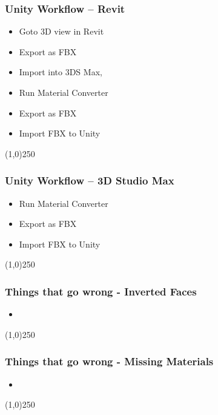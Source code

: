\begin{frame}
\frametitle{Unity Workflow -- Revit}
\begin{itemize}
	\item Goto 3D view in Revit
	\item Export as FBX
	\item Import into 3DS Max,
	\item Run Material Converter
	\item Export as FBX
	\item Import FBX to Unity
\end{itemize}
\end{frame}
\begin{center}\line(1,0){250}\end{center}


\begin{frame}
\frametitle{Unity Workflow -- 3D Studio Max}
\begin{itemize}
	\item Run Material Converter
	\item Export as FBX
	\item Import FBX to Unity
\end{itemize}
\end{frame}
\begin{center}\line(1,0){250}\end{center}





\begin{frame}
\frametitle{Things that go wrong - Inverted Faces }
\begin{figure}
	\centering
	\caption[]{}
	\label{fig:}
\end{figure}
\begin{itemize}
	\item 
\end{itemize}
\end{frame}
\begin{center}\line(1,0){250}\end{center}


\begin{frame}
\frametitle{Things that go wrong - Missing Materials}
\begin{figure}
	\centering
	\caption[]{}
	\label{fig:}
\end{figure}
\begin{itemize}
	\item 
\end{itemize}
\end{frame}
\begin{center}\line(1,0){250}\end{center}



